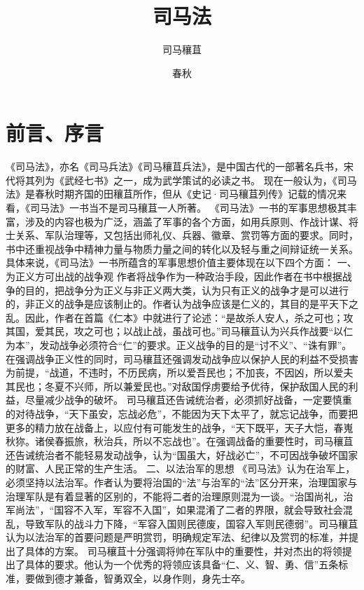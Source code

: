 \documentclass[a4paper,12pt,UTF8,twoside]{ctexbook}
\title{\heiti\zihao{0} 司马法}
\author{司马穰苴}
\date{春秋}
\begin{document}
\maketitle
\tableofcontents

\frontmatter
\chapter{前言、序言}

《司马法》，亦名《司马兵法》《司马穰苴兵法》，是中国古代的一部著名兵书，宋代将其列为《武经七书》之一，成为武学策试的必读之书。
现在一般认为，《司马法》是春秋时期齐国的田穰苴所作，但从《史记·司马穰苴列传》记载的情况来看，《司马法》一书当不是司马穰苴一人所著。
《司马法》一书的军事思想极其丰富，涉及的内容也极为广泛，涵盖了军事的各个方面，如用兵原则、作战计谋、将士关系、军队治理等，又包括出师礼仪、兵器、徽章、赏罚等方面的要求。同时，书中还重视战争中精神力量与物质力量之间的转化以及轻与重之间辩证统一关系。具体来说，《司马法》一书所蕴含的军事思想价值主要体现在以下四个方面：
一、为正义方可出战的战争观
作者将战争作为一种政治手段，因此作者在书中根据战争的目的，把战争分为正义与非正义两大类，认为只有正义的战争才是可以进行的，非正义的战争是应该制止的。作者认为战争应该是仁义的，其目的是平天下之乱。因此，作者在首篇《仁本》中就进行了论述：“是故杀人安人，杀之可也；攻其国，爱其民，攻之可也；以战止战，虽战可也。”司马穰苴认为兴兵作战要“以仁为本”，发动战争必须符合“仁”的要求。正义战争的目的是“讨不义”、“诛有罪”。
在强调战争正义性的同时，司马穰苴还强调发动战争应以保护人民的利益不受损害为前提，“战道，不违时，不历民病，所以爱吾民也；不加丧，不因凶，所以爱夫其民也；冬夏不兴师，所以兼爱民也。”对敌国俘虏要给予优待，保护敌国人民的利益，尽量减少战争的破坏。
司马穰苴还告诫统治者，必须抓好战备，一定要慎重的对待战争，“天下虽安，忘战必危”，不能因为天下太平了，就忘记战争，而要把更多的精力放在战备上，以应付有可能发生的战争，“天下既平，天子大恺，春嵬秋狝。诸侯春振旅，秋治兵，所以不忘战也”。在强调战备的重要性时，司马穰苴还告诫统治者不能轻易发动战争，认为“国虽大，好战必亡”，不可因战争破坏国家的财富、人民正常的生产生活。
二、以法治军的思想
《司马法》认为在治军上，必须坚持以法治军。作者认为要将治国的“法”与治军的“法”区分开来，治理国家与治理军队是有着显著的区别的，不能将二者的治理原则混为一谈。“治国尚礼，治军尚法”，“国容不入军，军容不入国”，如果混淆了二者的界限，就会导致社会混乱，导致军队的战斗力下降，“军容入国则民德废，国容入军则民德弱”。司马穰苴认为以法治军的首要问题是严明赏罚，明确规定军法、纪律以及赏罚的标准，并提出了具体的方案。
司马穰苴十分强调将帅在军队中的重要性，并对杰出的将领提出了具体的要求。他认为一个优秀的将领应该具备“仁、义、智、勇、信”五条标准，要做到德才兼备，智勇双全，以身作则，身先士卒。
\end{document}
